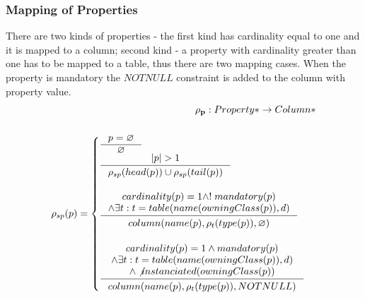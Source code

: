 \documentclass[11pt]{article}
\begin{document}
\subsubsection{Mapping of Properties}
There are two kinds of properties - the first kind has cardinality equal to one and it is mapped to a column; second kind - a property with cardinality greater than one has to be mapped to a table, thus there are two mapping cases. When the property is mandatory the $NOTNULL$ constraint is added to the column with property value. 
\begin{align*}
	\mathbf{\rho_p} : Property* \rightarrow Column* \\ \\
	\rho_{sp}(p) = \begin{cases}
		\inference{p = \varnothing}{\varnothing}\\
		\inference{|p| > 1}{\rho_{sp}(head(p)) \cup \rho_{sp}(tail(p))}\\\\
 		\inference{cardinality(p) = 1 \wedge !\;mandatory(p)
 			\\ \wedge \exists t : t = table(name(owningClass(p)), d) 
		 }{\begin{gathered}
	  		column(name(p), \rho_t(type(p)), \varnothing )
		\end{gathered}} \\ \\
  		\inference{cardinality(p) = 1 \wedge mandatory(p)
			 \\ \wedge \exists t : t = table(name(owningClass(p)), d)
			\\ \wedge \not instanciated(owningClass(p))
		}{\begin{gathered}
 	 		column(name(p), \rho_t(type(p)), NOTNULL ) \\ 
		\end{gathered}}
 	\end{cases}
\end{align*}
\end{document}
